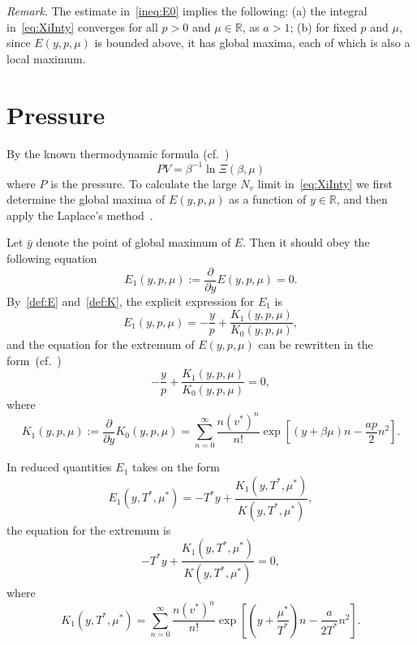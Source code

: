 \documentclass[12pt]{article}
\numberwithin{equation}{section}
\begin{document}
	\textit{Remark}. The estimate in~\eqref{ineq:E0} implies the following: (a) the integral in~\eqref{eq:XiInty} converges for all $p>0$ and $\mu \in \mathbb{R}$, as $a>1$; (b) for fixed $p$ and $\mu$, since $E(y,p,\mu)$ is bounded above, it has global maxima, each of which is also a local maximum.
	
	
	\section{Pressure}
	By the known thermodynamic formula (cf.~\cite[(2.16)]{KKD20})
	\begin{equation}
		\label{def:eos}
		P V = \beta^{-1} \ln \Xi(\beta, \mu)
	\end{equation}
	where $P$ is the pressure. To calculate the large $N_v$ limit in~\eqref{eq:XiInty} we first determine the global maxima of $E(y,p,\mu)$ as a function of $y \in \mathbb{R}$, and then apply the Laplace's method~\cite{Fedoryuk89}.
	
	Let $\bar{y}$ denote the point of global maximum of $E$. Then it should obey the following equation
	\begin{equation}
		\label{def:E1}
		E_1(y,p,\mu) := \frac{\partial}{\partial y} E(y,p,\mu) = 0.
	\end{equation}
	By~\eqref{def:E} and~\eqref{def:K}, the explicit expression for $E_1$ is
	\begin{equation}
		E_1(y,p,\mu) = -\frac{y}{p} + \frac{K_1(y,p,\mu)}{K_0(y,p,\mu)},
	\end{equation}
	and the equation for the extremum of $E(y,p,\mu)$ can be rewritten in the form~(cf.~\cite[(2.19)]{KKD20})
	\begin{equation}
		\label{eq:bar_y}
		-\frac{y}{p} + \frac{K_1(y,p,\mu)}{K_0(y,p,\mu)} = 0,
	\end{equation}
	where
	\begin{equation}
		K_1(y,p,\mu) := \frac{\partial}{\partial y} K_0(y,p,\mu) = \sum_{n=0}^{\infty} \frac{n (v^*)^n}{n!} \exp[(y+\beta\mu)n - \frac{ap}{2}n^2].
	\end{equation}
	
	\begin{mdframed}[linecolor=black,linewidth=1pt,leftline=true]
		In reduced quantities $E_1$ takes on the form
		\begin{equation}
			\label{def:reducedE1}
			E_1(y,T^*,\mu^*) = -T^* y + \frac{K_1(y,T^*,\mu^*)}{K(y,T^*,\mu^*)},
		\end{equation}
		the equation for the extremum is
		\begin{equation}
			\label{eq:bary2}
			-T^* y + \frac{K_1(y,T^*,\mu^*)}{K(y,T^*,\mu^*)} = 0,
		\end{equation}
		where
		\begin{equation}
			K_1(y,T^*,\mu^*) = \sum_{n=0}^{\infty} \frac{n (v^*)^n}{n!} \exp[\left(y+\frac{\mu^*}{T^*}\right)n - \frac{a}{2T^*}n^2].
		\end{equation}
	\end{mdframed}
	
\end{document}
